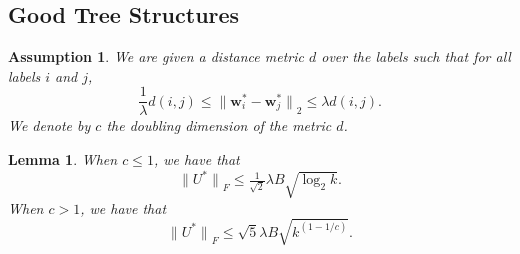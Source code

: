 \documentclass[twoside]{article}
\newtheorem{assumption}{Assumption}
\newtheorem{lemma}{Lemma}
\renewcommand{\star}[1]{{#1}^{*}}
\newcommand{\w}{\mathbf w}
\newcommand{\ltwo}[1]{{\lVert {#1} \rVert}_2}
\newcommand{\lF}[1]{{\lVert {#1} \rVert}_F}
\begin{document}
\subsection{Good Tree Structures}

\begin{assumption}
We are given a distance metric $d$ over the labels such that for all labels $i$ and $j$,
\begin{equation}
    \frac 1 \lambda d(i,j)
    \le \ltwo{\star \w_i - \star \w_j}
    \le \lambda d(i, j).
\end{equation}
We denote by $c$ the doubling dimension of the metric $d$.
\end{assumption}

\begin{lemma}
    \label{lemma:main}
    When $c\le1$, we have that
    \begin{equation}
        \lF{\star U} \le \tfrac{1}{\sqrt2}\lambda B \sqrt{\log_2 k}.
        \label{eq:c<=1}
    \end{equation}
    When $c>1$, we have that
    \begin{equation}
        \lF{\star U} \le \sqrt{5}\lambda B \sqrt{k^{(1-1/c)}}.
        \label{eq:c>1}
    \end{equation}
\end{lemma}
\end{document}
